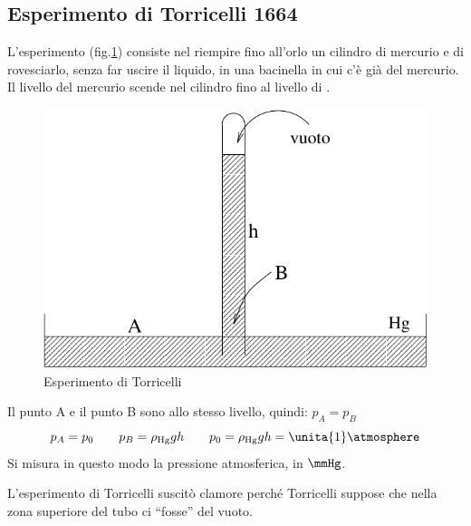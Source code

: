 \subsection{Esperimento di Torricelli 1664}
L'esperimento (fig.\@\ref{estor}) consiste nel riempire fino all'orlo un cilindro di mercurio e di rovesciarlo, senza far uscire il liquido, in una bacinella in cui c'è già del mercurio. Il livello del mercurio scende nel cilindro fino al livello di \meter.
\begin{figure}[htbp]
\centering
\includegraphics[scale=0.7]{immagini/fisica1/Torricelli}
\caption{Esperimento di Torricelli}
\label{estor}
\end{figure}

Il punto A e il punto B sono allo stesso livello, quindi: $p_A=p_B$
\begin{equation*}p_A=p_0\qquad p_B=\rho_{\mathrm{Hg}}gh\qquad p_0=\rho_\mathrm{Hg}gh=\unita{1}\atmosphere\end{equation*}
Si misura in questo modo la pressione atmosferica, in $\mmHg$.

L'esperimento di Torricelli suscitò clamore perché Torricelli suppose che nella zona superiore del tubo ci ``fosse'' del vuoto.

